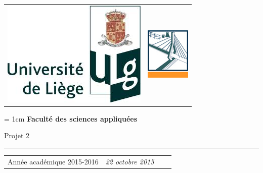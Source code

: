 \documentclass[a4paper, 11pt]{article}
\begin{document}

\begin{titlepage}
	
	
	\begin{tabular}{p{11cm}p{8cm}}    
		\includegraphics[scale=0.4]{Fig/logo_ulg.png}  &\raggedright{\includegraphics[scale=0.6]{Fig/Logo_FSAnew.png}}\\
	\end{tabular}
	
	\begin{center}
		\unitlength = 1cm
		\vspace{0.1cm}
		\Large\textbf{Faculté des sciences appliquées}\\
		\vspace{2.5cm}
		\Large  {}
		\vspace*{2cm}
		\huge
		\begin{center}
			Projet 2\\
			\rule{13cm}{0.5mm}
		\end{center}
	\end{center}
	
	\vspace*{4cm}
	
	\vspace*{4cm}
	
	
	\begin{tabular}{p{14cm}p{15cm} l r}    
		Année académique 2015-2016 
		&\raggedright{\large \noindent \textsl{22 octobre 2015}}
	\end{tabular}
\end{titlepage}
   \setcounter{page}{1}
\end{document}
